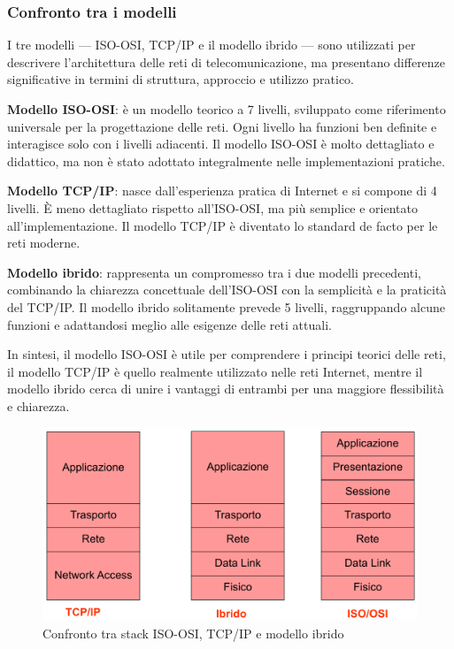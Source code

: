 \subsubsection{Confronto tra i modelli}
I tre modelli — ISO-OSI, TCP/IP e il modello ibrido — sono utilizzati per descrivere l’architettura delle reti di telecomunicazione, ma presentano differenze significative in termini di struttura, approccio e utilizzo pratico.

\textbf{Modello ISO-OSI}: è un modello teorico a 7 livelli, sviluppato come riferimento universale per la progettazione delle reti. Ogni livello ha funzioni ben definite e interagisce solo con i livelli adiacenti. Il modello ISO-OSI è molto dettagliato e didattico, ma non è stato adottato integralmente nelle implementazioni pratiche.

\textbf{Modello TCP/IP}: nasce dall’esperienza pratica di Internet e si compone di 4 livelli. È meno dettagliato rispetto all’ISO-OSI, ma più semplice e orientato all’implementazione. Il modello TCP/IP è diventato lo standard de facto per le reti moderne.

\textbf{Modello ibrido}: rappresenta un compromesso tra i due modelli precedenti, combinando la chiarezza concettuale dell’ISO-OSI con la semplicità e la praticità del TCP/IP. Il modello ibrido solitamente prevede 5 livelli, raggruppando alcune funzioni e adattandosi meglio alle esigenze delle reti attuali.

In sintesi, il modello ISO-OSI è utile per comprendere i principi teorici delle reti, il modello TCP/IP è quello realmente utilizzato nelle reti Internet, mentre il modello ibrido cerca di unire i vantaggi di entrambi per una maggiore flessibilità e chiarezza.

\begin{figure}[h!]
    \centering
    \includegraphics[width=1\textwidth]{images/confronto_stack.png}
    \caption{Confronto tra stack ISO-OSI, TCP/IP e modello ibrido}
    \label{fig:confronto_stack}
\end{figure}